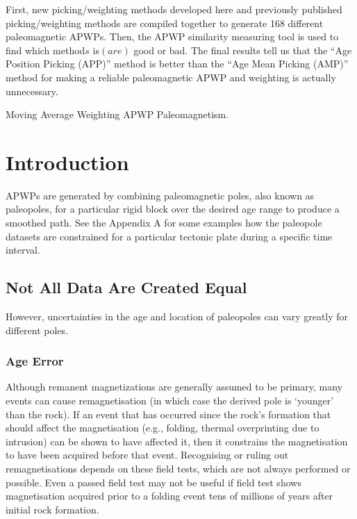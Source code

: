 \begin{summary}
First, new picking/weighting methods developed here and previously published
picking/weighting methods are compiled together to generate 168 different
paleomagnetic APWPs. Then, the APWP similarity measuring tool is used to find
which method\(s\) is$(are)$ good or bad. The final results tell us that the
``Age Position Picking (APP)'' method is better than the ``Age Mean Picking
(AMP)'' method for making a reliable paleomagnetic APWP and weighting is
actually unnecessary.
\end{summary}

\begin{keywords}
  Moving Average \textendash{} Weighting \textendash{} APWP \textendash{}
  Paleomagnetism.
\end{keywords}

\section{Introduction}

APWPs are generated by combining paleomagnetic poles, also known as paleopoles,
for a particular rigid block over the desired age range to produce a smoothed
path. See the Appendix A for some examples how the paleopole datasets are
constrained for a particular tectonic plate during a specific time interval.

\subsection{Not All Data Are Created Equal}

However, uncertainties in the age and location of paleopoles can vary greatly
for different poles.

\subsubsection{Age Error}

Although remanent magnetizations are generally assumed to be primary, many
events can cause remagnetisation (in which case the derived pole is `younger'
than the rock). If an event that has occurred since the rock's formation that
should affect the magnetisation (e.g., folding, thermal overprinting due to
intrusion) can be shown to have affected it, then it constrains the
magnetisation to have been acquired before that event. Recognising or ruling
out remagnetisations depends on these field tests, which are not always
performed or possible. Even a passed field test may not be useful if field test
shows magnetisation acquired prior to a folding event tens of millions of years
after initial rock formation.

